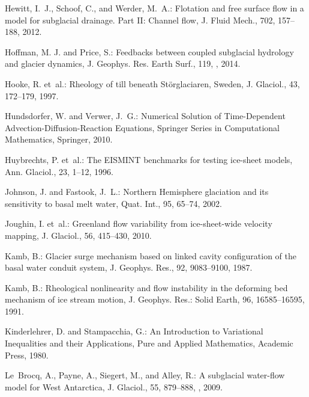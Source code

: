 \documentclass[gmd]{copernicus}   %
\begin{document}
\begin{thebibliography}{}
Hewitt, I.~J., Schoof, C., and Werder, M.~A.: Flotation and free surface flow
  in a model for subglacial drainage. {P}art {II}: {C}hannel flow, J. Fluid
  Mech., 702, 157--188, 2012.

Hoffman, M. J. and Price, S.: Feedbacks between coupled subglacial hydrology and glacier dynamics, J. Geophys. Res. Earth Surf., 119, , 2014.

Hooke, R. et~al.: Rheology of
  till beneath {S}t\"orglaciaren, {S}weden, J. Glaciol., 43, 172--179, 1997.

Hundsdorfer, W. and Verwer, J.~G.: Numerical {S}olution of {T}ime-{D}ependent
  {A}dvection-{D}iffusion-{R}eaction {E}quations, Springer Series in
  Computational Mathematics, Springer, 2010.

Huybrechts, P. et~al.: The {EISMINT} benchmarks for testing ice-sheet models,
  Ann. Glaciol., 23, 1--12, 1996.

Johnson, J. and Fastook, J.~L.: Northern {H}emisphere glaciation and its
  sensitivity to basal melt water, Quat. Int., 95, 65--74, 2002.

Joughin, I. et~al.: Greenland flow variability from ice-sheet-wide velocity
  mapping, J. Glaciol., 56, 415--430, 2010.

Kamb, B.: Glacier surge mechanism based on linked cavity configuration of the
  basal water conduit system, J. Geophys. Res., 92, 9083--9100, 1987.

Kamb, B.: Rheological nonlinearity and flow instability in the deforming bed
  mechanism of ice stream motion, J. Geophys. Res.: Solid Earth, 96, 16585--16595, 1991.

Kinderlehrer, D. and Stampacchia, G.: An {I}ntroduction to {V}ariational
  {I}nequalities and their {A}pplications, Pure and Applied Mathematics,
  Academic Press, 1980.

Le~Brocq, A., Payne, A., Siegert, M., and Alley, R.: A subglacial water-flow
  model for {W}est {A}ntarctica, J. Glaciol., 55, 879--888,
  , 2009.


\end{thebibliography}
\end{document}
